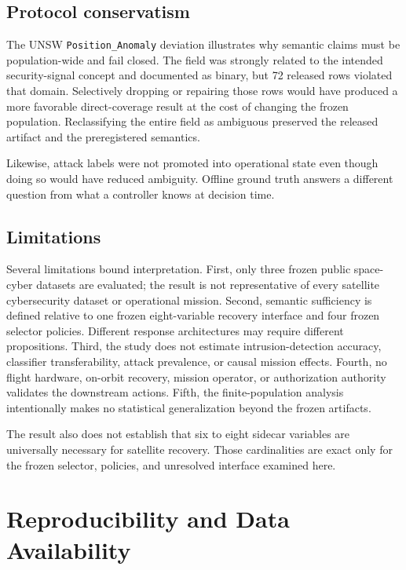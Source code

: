 \documentclass[preprint,12pt]{elsarticle}
\begin{document}
\subsection{Protocol conservatism}

The UNSW \texttt{Position\_Anomaly} deviation illustrates why semantic claims must be population-wide and fail closed. The field was strongly related to the intended security-signal concept and documented as binary, but 72 released rows violated that domain. Selectively dropping or repairing those rows would have produced a more favorable direct-coverage result at the cost of changing the frozen population. Reclassifying the entire field as ambiguous preserved the released artifact and the preregistered semantics.

Likewise, attack labels were not promoted into operational state even though doing so would have reduced ambiguity. Offline ground truth answers a different question from what a controller knows at decision time.

\subsection{Limitations}

Several limitations bound interpretation. First, only three frozen public space-cyber datasets are evaluated; the result is not representative of every satellite cybersecurity dataset or operational mission. Second, semantic sufficiency is defined relative to one frozen eight-variable recovery interface and four frozen selector policies. Different response architectures may require different propositions. Third, the study does not estimate intrusion-detection accuracy, classifier transferability, attack prevalence, or causal mission effects. Fourth, no flight hardware, on-orbit recovery, mission operator, or authorization authority validates the downstream actions. Fifth, the finite-population analysis intentionally makes no statistical generalization beyond the frozen artifacts.

The result also does not establish that six to eight sidecar variables are universally necessary for satellite recovery. Those cardinalities are exact only for the frozen selector, policies, and unresolved interface examined here.

\section{Reproducibility and Data Availability}
\end{document}
